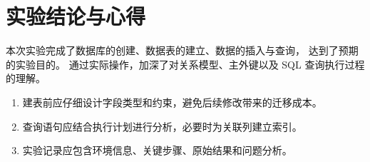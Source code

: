 \chapter{实验结论与心得}

本次实验完成了数据库的创建、数据表的建立、数据的插入与查询，
达到了预期的实验目的。
通过实际操作，加深了对关系模型、主外键以及 SQL 查询执行过程的理解。

\begin{enumerate}
  \item 建表前应仔细设计字段类型和约束，避免后续修改带来的迁移成本。
  \item 查询语句应结合执行计划进行分析，必要时为关联列建立索引。
  \item 实验记录应包含环境信息、关键步骤、原始结果和问题分析。
\end{enumerate}

